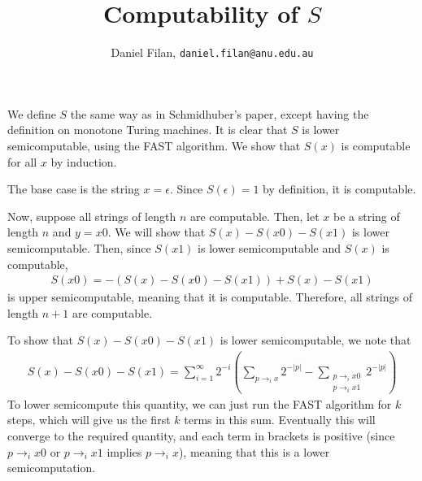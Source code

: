 \documentclass[12pt]{article}
\title{Computability of $S$}
\author{Daniel Filan, \texttt{daniel.filan@anu.edu.au}}
\date{}
\begin{document}
\maketitle

We define $S$ the same way as in Schmidhuber's paper, except having the definition on monotone Turing machines. It is clear that $S$ is lower semicomputable, using the FAST algorithm. We show that $S(x)$ is computable for all $x$ by induction.

The base case is the string $x = \epsilon$. Since $S(\epsilon) = 1$ by definition, it is computable.

Now, suppose all strings of length $n$ are computable. Then, let $x$ be a string of length $n$ and $y = x0$. We will show that $S(x) - S(x0) - S(x1)$ is lower semicomputable. Then, since $S(x1)$ is lower semicomputable and $S(x)$ is computable,
\begin{align*}
  S(x0) = -(S(x)-S(x0)-S(x1)) + S(x)- S(x1)
\end{align*}
is upper semicomputable, meaning that it is computable. Therefore, all strings of length $n+1$ are computable.

To show that $S(x) - S(x0) - S(x1)$ is lower semicomputable, we note that
\begin{align*}
  S(x)- S(x0) - S(x1) = \sum_{i = 1}^\infty 2^{-i} \left( \sum_{p \rightarrow_i x} 2^{-|p|} - \sum_{\substack{
        p \rightarrow_i x0 \\
        p \rightarrow_i x1
      }} 2^{-|p|} \right)
\end{align*}
To lower semicompute this quantity, we can just run the FAST algorithm for $k$ steps, which will give us the first $k$ terms in this sum. Eventually this will converge to the required quantity, and each term in brackets is positive (since $p \rightarrow_i x0$ or $p \rightarrow_i x1$ implies $p \rightarrow_i x$), meaning that this is a lower semicomputation.
\end{document}
